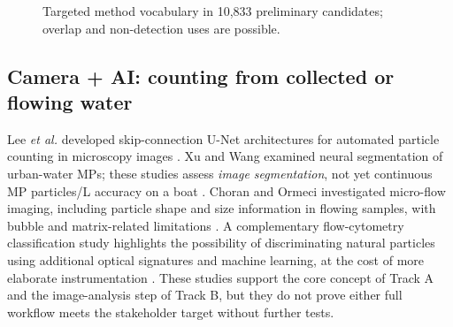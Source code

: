\documentclass[10pt,a4paper]{article}
\begin{document}
\begin{figure}[H]\centering
{}
\caption{Targeted method vocabulary in 10,833 preliminary candidates; overlap and non-detection uses are possible.}\label{fig:targeted}
\end{figure}

\subsection{Camera + AI: counting from collected or flowing water}
Lee \emph{et al.} developed skip-connection U-Net architectures for automated particle counting in microscopy images \cite{Lee2022}. Xu and Wang examined neural segmentation of urban-water MPs; these studies assess \emph{image segmentation}, not yet continuous MP particles/L accuracy on a boat \cite{UrbanCNN2024}. Choran and Ormeci investigated micro-flow imaging, including particle shape and size information in flowing samples, with bubble and matrix-related limitations \cite{Microflow2023}. A complementary flow-cytometry classification study highlights the possibility of discriminating natural particles using additional optical signatures and machine learning, at the cost of more elaborate instrumentation \cite{Wang2024}. These studies support the core concept of Track A and the image-analysis step of Track B, but they do not prove either full workflow meets the stakeholder target without further tests.
\end{document}
